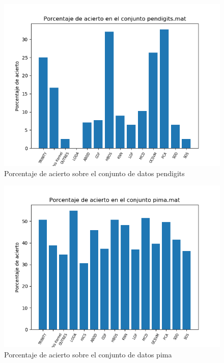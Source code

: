 \begin{figure}[H]
	\centering
	\includegraphics[scale=0.7]{imagenes/imgs-exp1/accuracy/pendigits}
	\caption{Porcentaje de acierto sobre el conjunto de datos pendigits}
	\label{pendigits_accuracy}
\end{figure}

\begin{figure}[H]
	\centering
	\includegraphics[scale=0.7]{imagenes/imgs-exp1/accuracy/pima}
	\caption{Porcentaje de acierto sobre el conjunto de datos pima}
	\label{pima_accuracy}
\end{figure}


